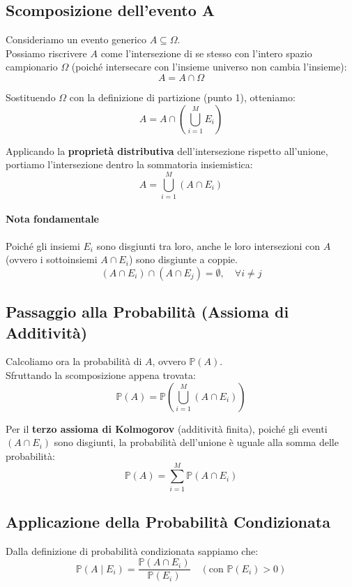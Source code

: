 \subsection{Scomposizione dell'evento A}

Consideriamo un evento generico $A \subseteq \Omega$.
\\Possiamo riscrivere $A$ come l'intersezione di se stesso con l'intero spazio campionario $\Omega$ (poiché intersecare con l'insieme universo non cambia l'insieme):
\[ A = A \cap \Omega \]

Sostituendo $\Omega$ con la definizione di partizione (punto 1), otteniamo:
\[ A = A \cap \left( \bigcup_{i=1}^M E_i \right) \]

Applicando la \textbf{proprietà distributiva} dell'intersezione rispetto all'unione, portiamo l'intersezione dentro la sommatoria insiemistica:
\[ A = \bigcup_{i=1}^M (A \cap E_i) \]

\paragraph{Nota fondamentale}
Poiché gli insiemi $E_i$ sono disgiunti tra loro, anche le loro intersezioni con $A$ (ovvero i sottoinsiemi $A \cap E_i$) sono disgiunte a coppie.
\[ (A \cap E_i) \cap (A \cap E_j) = \emptyset, \quad \forall i \neq j \]

\subsection{Passaggio alla Probabilità (Assioma di Additività)}

Calcoliamo ora la probabilità di $A$, ovvero $\mathbb{P}(A)$.
\\Sfruttando la scomposizione appena trovata:
\[ \mathbb{P}(A) = \mathbb{P}\left( \bigcup_{i=1}^M (A \cap E_i) \right) \]

Per il \textbf{terzo assioma di Kolmogorov} (additività finita), poiché gli eventi $(A \cap E_i)$ sono disgiunti, la probabilità dell'unione è uguale alla somma delle probabilità:
\[ \mathbb{P}(A) = \sum_{i=1}^M \mathbb{P}(A \cap E_i) \]

\subsection{Applicazione della Probabilità Condizionata}

Dalla definizione di probabilità condizionata sappiamo che:
\[ \mathbb{P}(A \mid E_i) = \frac{\mathbb{P}(A \cap E_i)}{\mathbb{P}(E_i)} \quad (\text{con } \mathbb{P}(E_i) > 0) \]

